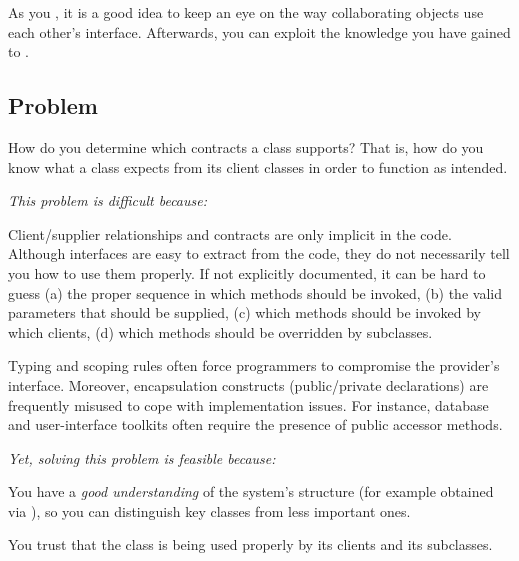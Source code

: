 \documentclass[a4paper,10pt,twoside]{book}
\begin{document}
As you , it is a good idea to keep an eye on the way collaborating objects use each other's interface. Afterwards, you can exploit the knowledge you have gained to .



\subsection*{Problem}

How do you determine which contracts a class supports? That is, how do you know what a class expects from its client classes in order to function as intended.

\emph{This problem is difficult because:}

\begin{bulletlist}
\item Client/supplier relationships and contracts are only implicit in the code. Although interfaces are easy to extract from the code, they do not necessarily tell you how to use them properly. If not explicitly documented, it can be hard to guess (a) the proper sequence in which methods should be invoked, (b) the valid parameters that should be supplied, (c) which methods should be invoked by which clients, (d) which methods should be overridden by subclasses.

\item Typing and scoping rules often force programmers to compromise the provider's interface. Moreover, encapsulation constructs (\eg public/private declarations) are frequently misused to cope with implementation issues. For instance, database and user-interface toolkits often require the presence of public accessor methods.
\end{bulletlist}

\emph{Yet, solving this problem is feasible because:}

\begin{bulletlist}
\item You have a \emph{good understanding} of the system's structure (for example obtained via ), so you can distinguish key classes from less important ones.

\item You trust that the class is being used properly by its clients and its subclasses.
\end{bulletlist}
\end{document}
